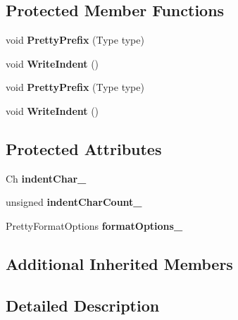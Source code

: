 \subsection*{Protected Member Functions}
\begin{DoxyCompactItemize}
\item 
\mbox{\label{classPrettyWriter_a7841433d45abbfc5a1799be0ca1ed792}} 
void {\bfseries Pretty\+Prefix} (Type type)
\item 
\mbox{\label{classPrettyWriter_a649ec900d77960e085f76bb4d3c351d9}} 
void {\bfseries Write\+Indent} ()
\item 
\mbox{\label{classPrettyWriter_a7841433d45abbfc5a1799be0ca1ed792}} 
void {\bfseries Pretty\+Prefix} (Type type)
\item 
\mbox{\label{classPrettyWriter_a649ec900d77960e085f76bb4d3c351d9}} 
void {\bfseries Write\+Indent} ()
\end{DoxyCompactItemize}
\subsection*{Protected Attributes}
\begin{DoxyCompactItemize}
\item 
\mbox{\label{classPrettyWriter_a2cee1f24795fd6c56420df31d336c41d}} 
Ch {\bfseries indent\+Char\+\_\+}
\item 
\mbox{\label{classPrettyWriter_ab2cffe9d93ce8a4890f927832f00d9f1}} 
unsigned {\bfseries indent\+Char\+Count\+\_\+}
\item 
\mbox{\label{classPrettyWriter_ac8ad785041a5e6791c26991a1db0cf9c}} 
Pretty\+Format\+Options {\bfseries format\+Options\+\_\+}
\end{DoxyCompactItemize}
\subsection*{Additional Inherited Members}


\subsection{Detailed Description}
